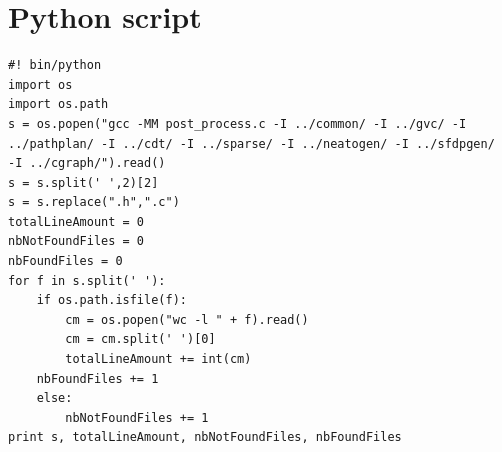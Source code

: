 \documentclass[12pt]{report}
\begin{document}
\appendix
\chapter{Python script}

\begin{verbatim}
#! bin/python
import os
import os.path
s = os.popen("gcc -MM post_process.c -I ../common/ -I ../gvc/ -I 
../pathplan/ -I ../cdt/ -I ../sparse/ -I ../neatogen/ -I ../sfdpgen/ 
-I ../cgraph/").read()
s = s.split(' ',2)[2]
s = s.replace(".h",".c")
totalLineAmount = 0
nbNotFoundFiles = 0
nbFoundFiles = 0
for f in s.split(' '):
    if os.path.isfile(f):
        cm = os.popen("wc -l " + f).read()
        cm = cm.split(' ')[0]
        totalLineAmount += int(cm)
	nbFoundFiles += 1
    else:
        nbNotFoundFiles += 1
print s, totalLineAmount, nbNotFoundFiles, nbFoundFiles
\end{verbatim}



\end{document}
